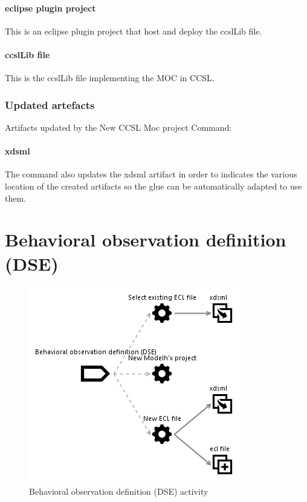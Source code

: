 \documentclass{gemoc} %
\begin{document}
\paragraph{eclipse plugin project} 
This is an eclipse plugin project that host and deploy the ccslLib file.\paragraph{ccslLib file} 
This is the ccslLib file implementing the MOC in CCSL.
\subsubsection{Updated artefacts}
Artifacts updated by the New CCSL Moc project Command:
\paragraph{xdsml} 
The command also updates the xdsml artifact in order to indicates the various location of the created artifacts so the glue can be automatically adapted to use them.

\section{Behavioral observation definition (DSE)}
\label{sec:Behavioral_observation_definition_(DSE)}
\begin{figure}[h]
		\center
		\includegraphics*[trim=0.0cm 0.0cm 0cm 0.0cm, clip=true]{fig/Behavioral_observation_definition_(DSE)}
		\caption{Behavioral observation definition (DSE) activity}
		\label{fig:Behavioral_observation_definition_(DSE)}
\end{figure}
\end{document}
